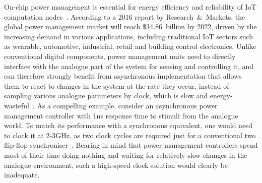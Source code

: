 \documentclass[british,compsoc]{IEEEtran}
\begin{document}
On-chip power management is essential for energy efficiency and reliability of
IoT computation nodes~\cite{7287733}. According to a 2016 report by
Research~\&~Markets, the global power management market will reach \$34.86~billion
by 2022, driven by the increasing demand in various applications, including
traditional IoT sectors such as wearable, automotive, industrial, retail and
building control electronics. Unlike conventional digital components, power
management units need to directly interface with the analogue part of the system
for sensing and controlling it, and can therefore strongly benefit from asynchronous
implementation that allows them to react to changes in the system at the rate
they occur, instead of sampling various analogue parameters by clock, which is
slow and energy-wasteful~\cite{2014_sokolov_ftfc}\cite{sokolov2015design}.
As a compelling example, consider an asynchronous power management controller with
1ns response time to stimuli from the analogue world. To match its performance
with a synchronous equivalent, one would need to clock it at 2-3GHz, as two clock
cycles are required just for a conventional two flip-flop
synchroniser~\cite{2008_kinniment_synchronisation}. Bearing in mind that
power management controllers spend most of their time doing nothing and
waiting for relatively slow changes in the analogue environment, such
a high-speed clock solution would clearly be inadequate.
\end{document}

